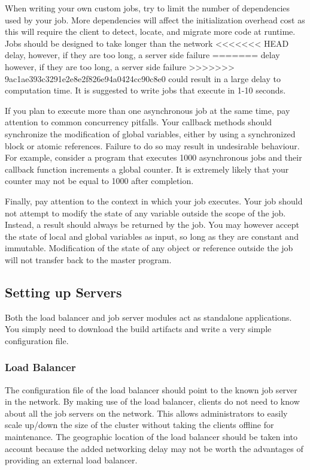 When writing your own custom jobs, try to limit the number of
dependencies used by your job.
More dependencies will affect the initialization overhead cost
as this will require the client to detect, locate, and migrate
more code at runtime.
Jobs should be designed to take longer than the network
<<<<<<< HEAD
delay, however, if they are too long, a server side failure
=======
delay however, if they are too long, a server side failure
>>>>>>> 9ac1ae393c3291e2e8e2f826e94a0424cc90c8e0
could result in a large delay to computation time.
It is suggested to write jobs that execute in 1-10 seconds.

If you plan to execute more than one asynchronous job at the
same time, pay attention to common concurrency pitfalls.
Your callback methods should synchronize the modification
of global variables, either by using a synchronized block or
atomic references.
Failure to do so may result in undesirable behaviour.
For example, consider a program that executes 1000 asynchronous
jobs and their callback function increments a global counter.
It is extremely likely that your counter may not be equal to 1000
after completion.

Finally, pay attention to the context in which your job executes.
Your job should not attempt to modify the state of any variable
outside the scope of the job.
Instead, a result should always be returned by the job.
You may however accept the state of local and global variables
as input, so long as they are constant and immutable.
Modification of the state of any object or reference outside the job
will not transfer back to the master program.

\subsection{Setting up Servers}\label{subsec:settingUpServers}

Both the load balancer and job server modules act as standalone
applications.
You simply need to download the build artifacts and write
a very simple configuration file.


\subsubsection{Load Balancer}

The configuration file of the load balancer should point
to the known job server in the network.
By making use of the load balancer, clients do not
need to know about all the job servers on the network.
This allows administrators to easily scale up/down the
size of the cluster without taking the clients offline for
maintenance.
The geographic location of the load balancer should
be taken into account because the added networking delay
may not be worth the advantages of providing an external
load balancer.

